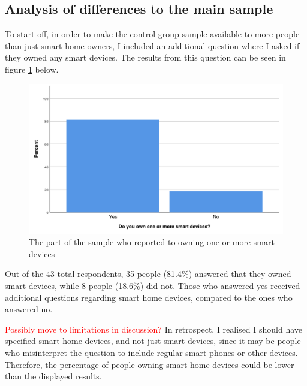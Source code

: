\subsection{Analysis of differences to the main sample}
To start off, in order to make the control group sample available to more people than just smart home owners, I included an additional question where I asked if they owned any smart devices. The results from this question can be seen in figure \ref{fig:controlgroup_ownsmartdevice} below. 
\begin{figure}[!h]
    \centering
    \includegraphics[scale=0.55]{figures/diagrams/controlgroup_ownsmartdevice.pdf}
    \caption{The part of the sample who reported to owning one or more smart devices}
    \label{fig:controlgroup_ownsmartdevice}
\end{figure}
Out of the 43 total respondents, 35 people (81.4\%) answered that they owned smart devices, while 8 people (18.6\%) did not. Those who answered yes received additional questions regarding smart home devices, compared to the ones who answered no. 

\textcolor{red}{Possibly move to limitations in discussion?}
In retrospect, I realised I should have specified smart home devices, and not just smart devices, since it may be people who misinterpret the question to include regular smart phones or other devices. Therefore, the percentage of people owning smart home devices could be lower than the displayed results. 

